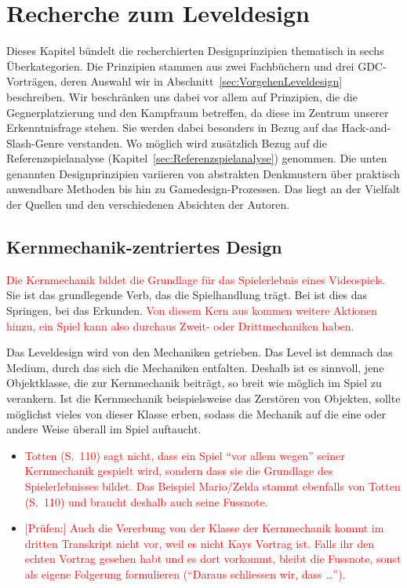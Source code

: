 \documentclass[../Main.tex]{subfiles}
\begin{document}
\section{Recherche zum Leveldesign} \label{sec:Leveldesign}
Dieses Kapitel bündelt die recherchierten Designprinzipien thematisch in sechs Überkategorien. Die Prinzipien stammen aus zwei Fachbüchern und drei GDC-Vorträgen, deren Auswahl wir in Abschnitt~\ref{sec:VorgehenLeveldesign} beschreiben. Wir beschränken uns dabei vor allem auf Prinzipien, die die Gegnerplatzierung und den Kampfraum betreffen, da diese im Zentrum unserer Erkenntnisfrage stehen. Sie werden dabei besonders in Bezug auf das Hack-and-Slash-Genre verstanden. Wo möglich wird zusätzlich Bezug auf die Referenzspielanalyse (Kapitel~\ref{sec:Referenzspielanalyse}) genommen. Die unten genannten Designprinzipien variieren von abstrakten Denkmustern über praktisch anwendbare Methoden bis hin zu Gamedesign-Prozessen. Das liegt an der Vielfalt der Quellen und den verschiedenen Absichten der Autoren.


\subsection{Kernmechanik-zentriertes Design} \label{sec:Kernmechanik}

\textcolor{red}{Die Kernmechanik bildet die Grundlage für das Spielerlebnis eines Videospiels.} Sie ist das grundlegende Verb, das die Spielhandlung trägt.\autocite[110]{totten2014architectural} Bei  ist dies das Springen, bei  das Erkunden.\textcolor{red}{\autocites[110]{totten2014architectural}{nintendo_supermariobros_1985,nintendo_zelda_1986}} \textcolor{red}{Von diesem Kern aus kommen weitere Aktionen hinzu, ein Spiel kann also durchaus Zweit- oder Drittmechaniken haben.\autocite[110]{totten2014architectural}}

Das Leveldesign wird von den Mechaniken getrieben. Das Level ist demnach das Medium, durch das sich die Mechaniken entfalten.\autocite{gdc_tenprinciples2010} Deshalb ist es sinnvoll, jene Objektklasse, die zur Kernmechanik beiträgt, so breit wie möglich im Spiel zu verankern. Ist die Kernmechanik beispielsweise das Zerstören von Objekten, sollte möglichst vieles von dieser Klasse erben, sodass die Mechanik auf die eine oder andere Weise überall im Spiel auftaucht.\autocite{gdc_movingmountains2020}

\begin{itemize}[leftmargin=1.5cm]
    \item \textcolor{red}{Totten (S.~110) sagt nicht, dass ein Spiel \enquote{vor allem wegen} seiner Kernmechanik gespielt wird, sondern dass sie die Grundlage des Spielerlebnisses bildet. Das Beispiel Mario/Zelda stammt ebenfalls von Totten (S.~110) und braucht deshalb auch seine Fussnote.}
    \item \textcolor{red}{[Prüfen:] Auch die Vererbung von der Klasse der Kernmechanik kommt im dritten Transkript nicht vor, weil es nicht Kays Vortrag ist. Falls ihr den echten Vortrag gesehen habt und es dort vorkommt, bleibt die Fussnote, sonst als eigene Folgerung formulieren (\enquote{Daraus schliessen wir, dass \ldots}).}
\end{itemize}
\end{document}
